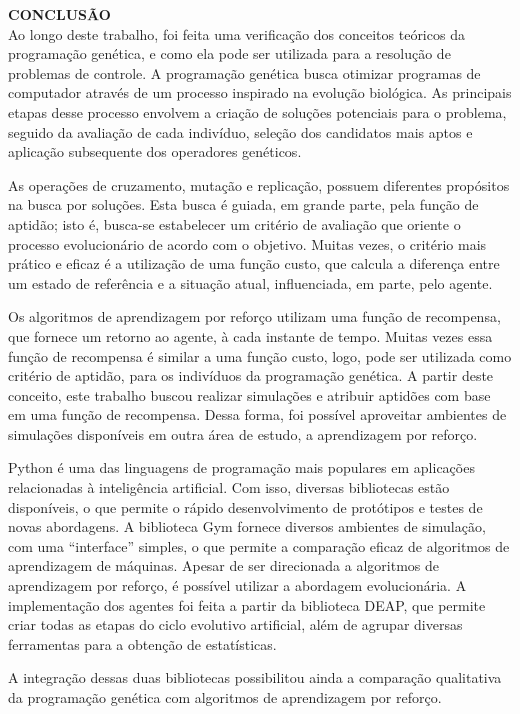 \noindent\textbf{CONCLUSÃO}
$\!$\\

Ao longo deste trabalho, foi feita uma verificação dos conceitos teóricos da programação genética, e como ela pode ser utilizada para a resolução de problemas de controle. A programação genética busca otimizar programas de computador através de um processo inspirado na evolução biológica. As principais etapas desse processo envolvem a criação de soluções potenciais para o problema, seguido da avaliação de cada indivíduo, seleção dos candidatos mais aptos e aplicação subsequente dos operadores genéticos.

As operações de cruzamento, mutação e replicação, possuem diferentes propósitos na busca por soluções. Esta busca é guiada, em grande parte, pela função de aptidão; isto é, busca-se estabelecer um critério de avaliação que oriente o processo evolucionário de acordo com o objetivo. Muitas vezes, o critério mais prático e eficaz é a utilização de uma função custo, que calcula a diferença entre um estado de referência e a situação atual, influenciada, em parte, pelo agente.

Os algoritmos de aprendizagem por reforço utilizam uma função de recompensa, que fornece um retorno ao agente, à cada instante de tempo. Muitas vezes essa função de recompensa é similar a uma função custo, logo, pode ser utilizada como critério de aptidão, para os indivíduos da programação genética. A partir deste conceito, este trabalho buscou realizar simulações e atribuir aptidões com base em uma função de recompensa. Dessa forma, foi possível aproveitar ambientes de simulações disponíveis em outra área de estudo, a aprendizagem por reforço.

Python é uma das linguagens de programação mais populares em aplicações relacionadas à inteligência artificial. Com isso, diversas bibliotecas estão disponíveis, o que permite o rápido desenvolvimento de protótipos e testes de novas abordagens. A biblioteca Gym \cite{openaigym} fornece diversos ambientes de simulação, com uma ``interface'' simples, o que permite a comparação eficaz de algoritmos de aprendizagem de máquinas. Apesar de ser direcionada a algoritmos de aprendizagem por reforço, é possível utilizar a abordagem evolucionária. A implementação dos agentes foi feita a partir da biblioteca DEAP, que permite criar todas as etapas do ciclo evolutivo artificial, além de agrupar diversas ferramentas para a obtenção de estatísticas.

A integração dessas duas bibliotecas possibilitou ainda a comparação qualitativa da programação genética com algoritmos de aprendizagem por reforço.

